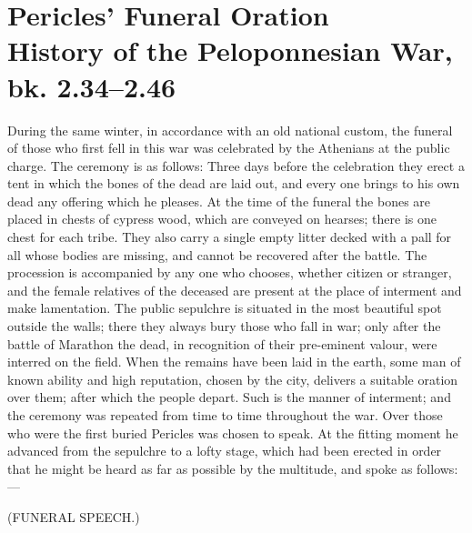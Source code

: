 
\author{Thucydides}
\chapter[Thucydides -- Pericles' Funeral Oration]{Pericles' Funeral
Oration\\\smaller History of the Peloponnesian War, bk. 2.34--2.46}


During the same winter, in accordance with an old national
custom, the funeral of those who first fell in this war was celebrated
by the Athenians at the public charge. The ceremony is as follows:
Three days before the celebration they erect a tent in which the bones
of the dead are laid out, and every one brings to his own dead any
offering which he pleases. At the time of the funeral the bones are
placed in chests of cypress wood, which are conveyed on hearses; there
is one chest for each tribe. They also carry a single empty litter
decked with a pall for all whose bodies are missing, and cannot be
recovered after the battle. The procession is accompanied by any one
who chooses, whether citizen or stranger, and the female relatives of
the deceased are present at the place of interment and make
lamentation. The public sepulchre is situated in the most beautiful
spot outside the walls; there they always bury those who fall in war;
only after the battle of Marathon the dead, in recognition of their
pre-eminent valour, were interred on the field. When the remains have
been laid in the earth, some man of known ability and high reputation,
chosen by the city, delivers a suitable oration over them; after
which the people depart. Such is the manner of interment; and
 the ceremony was repeated from time to time throughout the
war. Over those who were the first buried Pericles was chosen to
speak. At the fitting moment he advanced from the sepulchre to a lofty
stage, which had been erected in order that he might be heard as far
as possible by the multitude, and spoke as follows:---

\begin{center}\small(FUNERAL SPEECH.)\end{center}

